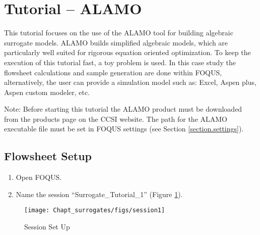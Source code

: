 \section{Tutorial -- ALAMO}
\label{sec.surrogate.alamo}
This tutorial focuses on the use of the ALAMO tool for building algebraic surrogate models. ALAMO builds simplified algebraic models, which are particularly well suited for rigorous equation oriented optimization. To keep the execution of this tutorial fast, a toy problem is used. In this case study the flowsheet calculations and sample generation are done within FOQUS, alternatively, the user can provide a simulation model such as: Excel, Aspen plus, Aspen custom modeler, etc. 

Note: Before starting this tutorial the ALAMO product must be downloaded from the products page on the CCSI website. The path for the ALAMO executable file must be set in FOQUS settings (see Section \ref{section.settings}).

\subsection{Flowsheet Setup}

\begin{enumerate}
	\item Open FOQUS.
	\item Name the session ``Surrogate\_Tutorial\_1'' (Figure \ref{fig.tut.sur.session}).
\end{enumerate}

\begin{figure}[H]
	\begin{center}
		\texttt{[image: Chapt\_surrogates/figs/session1]}
		\caption{Session Set Up}
		\label{fig.tut.sur.session}
	\end{center}
\end{figure}


